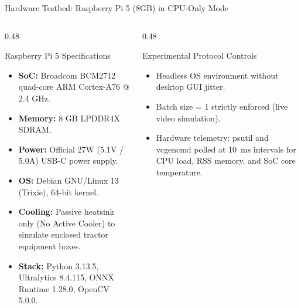 \documentclass[aspectratio=169,10pt]{beamer}
\begin{document}
\begin{frame}{Hardware Testbed: Raspberry Pi 5 (8GB) in CPU-Only Mode}
\begin{columns}[T]
  \begin{column}{0.48\textwidth}
    \begin{block}{\small Raspberry Pi 5 Specifications}
      \small
      \begin{itemize}
        \item \textbf{SoC:} Broadcom BCM2712 quad-core ARM Cortex-A76 @ 2.4 GHz.
        \item \textbf{Memory:} 8 GB LPDDR4X SDRAM.
        \item \textbf{Power:} Official 27W (5.1V / 5.0A) USB-C power supply.
        \item \textbf{OS:} Debian GNU/Linux 13 (Trixie), 64-bit kernel.
        \item \textbf{Cooling:} Passive heatsink only (No Active Cooler) to simulate enclosed tractor equipment boxes.
        \item \textbf{Stack:} Python 3.13.5, Ultralytics 8.4.115, ONNX Runtime 1.28.0, OpenCV 5.0.0.
      \end{itemize}
    \end{block}
  \end{column}
  \begin{column}{0.48\textwidth}
    \begin{block}{\small Experimental Protocol Controls}
      \small
      \begin{itemize}
        \item Headless OS environment without desktop GUI jitter.
        \item Batch size = 1 strictly enforced (live video simulation).
        \item Hardware telemetry: psutil and vcgencmd polled at 10~ms intervals for CPU load, RSS memory, and SoC core temperature.
      \end{itemize}
    \end{block}
  \end{column}
\end{columns}
\end{frame}
\end{document}
